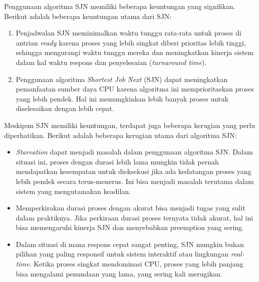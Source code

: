 \documentclass[12pt]{article}
\begin{document}
     \hspace{1cm}Penggunaan algoritma SJN memiliki beberapa keuntungan yang signifikan. Berikut adalah beberapa keuntungan utama dari SJN:
     \begin{enumerate}
         \item Penjadwalan SJN meminimalkan waktu tunggu rata-rata untuk proses di antrian \textit{ready} karena proses yang lebih singkat diberi prioritas lebih tinggi, sehingga mengurangi waktu tunggu mereka dan meningkatkan kinerja sistem dalam hal waktu respons dan penyelesaian (\textit{turnaround time}).
         \item Penggunaan algoritma \textit{Shortest Job Next} (SJN) dapat meningkatkan pemanfaatan sumber daya CPU karena algoritma ini memprioritaskan proses yang lebih pendek. Hal ini memungkinkan lebih banyak proses untuk diselesaikan dengan lebih cepat.
     \end{enumerate}
     
    \hspace{1cm}Meskipun SJN memiliki keuntungan, terdapat juga beberapa kerugian yang perlu diperhatikan. Berikut adalah beberapa kerugian utama dari algoritma SJN:
    \begin{itemize}
        \item \textit{Starvation} dapat menjadi masalah dalam penggunaan algoritma SJN. Dalam situasi ini, proses dengan durasi lebih lama mungkin tidak pernah mendapatkan kesempatan untuk dieksekusi jika ada kedatangan proses yang lebih pendek secara terus-menerus. Ini bisa menjadi masalah terutama dalam sistem yang mengutamakan keadilan.
        \item Memperkirakan durasi proses dengan akurat bisa menjadi tugas yang sulit dalam praktiknya. Jika perkiraan durasi proses ternyata tidak akurat, hal ini bisa memengaruhi kinerja SJN dan menyebabkan preemption yang sering.
        \item Dalam situasi di mana respons cepat sangat penting, SJN mungkin bukan pilihan yang paling responsif untuk sistem interaktif atau lingkungan \textit{real-time}. Ketika proses singkat mendominasi CPU, proses yang lebih panjang bisa mengalami penundaan yang lama, yang sering kali merugikan.
    \end{itemize}
\end{document}
